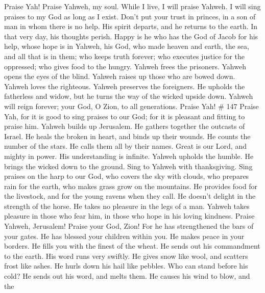  Praise Yah! Praise Yahweh, my soul.  While
I live, I will praise Yahweh. I will sing praises to my God as long as I
exist.  Don't put your trust in princes, in a son of man
in whom there is no help.  His spirit departs, and he
returns to the earth. In that very day, his thoughts perish.
 Happy is he who has the God of Jacob for his help, whose
hope is in Yahweh, his God,  who made heaven and earth,
the sea, and all that is in them; who keeps truth forever;
 who executes justice for the oppressed; who gives food to
the hungry. Yahweh frees the prisoners.  Yahweh opens the
eyes of the blind. Yahweh raises up those who are bowed down. Yahweh
loves the righteous.  Yahweh preserves the foreigners. He
upholds the fatherless and widow, but he turns the way of the wicked
upside down.  Yahweh will reign forever; your God, O
Zion, to all generations. Praise Yah! \# 147  Praise Yah,
for it is good to sing praises to our God; for it is pleasant and
fitting to praise him.  Yahweh builds up Jerusalem. He
gathers together the outcasts of Israel.  He heals the
broken in heart, and binds up their wounds.  He counts the
number of the stars. He calls them all by their names. 
Great is our Lord, and mighty in power. His understanding is infinite.
 Yahweh upholds the humble. He brings the wicked down to
the ground.  Sing to Yahweh with thanksgiving. Sing
praises on the harp to our God,  who covers the sky with
clouds, who prepares rain for the earth, who makes grass grow on the
mountains.  He provides food for the livestock, and for
the young ravens when they call.  He doesn't delight in
the strength of the horse. He takes no pleasure in the legs of a man.
 Yahweh takes pleasure in those who fear him, in those
who hope in his loving kindness.  Praise Yahweh,
Jerusalem! Praise your God, Zion!  For he has
strengthened the bars of your gates. He has blessed your children within
you.  He makes peace in your borders. He fills you with
the finest of the wheat.  He sends out his commandment to
the earth. His word runs very swiftly.  He gives snow
like wool, and scatters frost like ashes.  He hurls down
his hail like pebbles. Who can stand before his cold?  He
sends out his word, and melts them. He causes his wind to blow, and the
